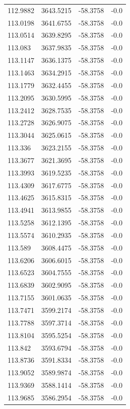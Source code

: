 \begin{table}[H]
\begin{tabular}{llll}
112.9882 & 3643.5215 & -58.3758 & -0.0 \\
113.0198 & 3641.6755 & -58.3758 & -0.0 \\
113.0514 & 3639.8295 & -58.3758 & -0.0 \\
113.083 & 3637.9835 & -58.3758 & -0.0 \\
113.1147 & 3636.1375 & -58.3758 & -0.0 \\
113.1463 & 3634.2915 & -58.3758 & -0.0 \\
113.1779 & 3632.4455 & -58.3758 & -0.0 \\
113.2095 & 3630.5995 & -58.3758 & -0.0 \\
113.2412 & 3628.7535 & -58.3758 & -0.0 \\
113.2728 & 3626.9075 & -58.3758 & -0.0 \\
113.3044 & 3625.0615 & -58.3758 & -0.0 \\
113.336 & 3623.2155 & -58.3758 & -0.0 \\
113.3677 & 3621.3695 & -58.3758 & -0.0 \\
113.3993 & 3619.5235 & -58.3758 & -0.0 \\
113.4309 & 3617.6775 & -58.3758 & -0.0 \\
113.4625 & 3615.8315 & -58.3758 & -0.0 \\
113.4941 & 3613.9855 & -58.3758 & -0.0 \\
113.5258 & 3612.1395 & -58.3758 & -0.0 \\
113.5574 & 3610.2935 & -58.3758 & -0.0 \\
113.589 & 3608.4475 & -58.3758 & -0.0 \\
113.6206 & 3606.6015 & -58.3758 & -0.0 \\
113.6523 & 3604.7555 & -58.3758 & -0.0 \\
113.6839 & 3602.9095 & -58.3758 & -0.0 \\
113.7155 & 3601.0635 & -58.3758 & -0.0 \\
113.7471 & 3599.2174 & -58.3758 & -0.0 \\
113.7788 & 3597.3714 & -58.3758 & -0.0 \\
113.8104 & 3595.5254 & -58.3758 & -0.0 \\
113.842 & 3593.6794 & -58.3758 & -0.0 \\
113.8736 & 3591.8334 & -58.3758 & -0.0 \\
113.9052 & 3589.9874 & -58.3758 & -0.0 \\
113.9369 & 3588.1414 & -58.3758 & -0.0 \\
113.9685 & 3586.2954 & -58.3758 & -0.0 \\

\end{tabular}
\end{table}
